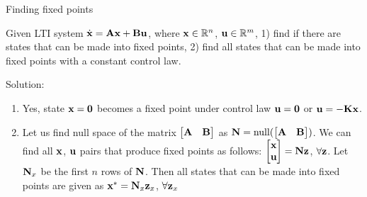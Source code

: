 \documentclass{beamer}
\begin{document}
\begin{frame}{Finding fixed points}
\begin{flushleft}

Given LTI system $\dot{\mathbf{x}} = \mathbf{A} \mathbf{x} + \mathbf{B} \mathbf{u}$, where $\mathbf{x} \in \mathbb{R}^n$, $\mathbf{u} \in \mathbb{R}^m$, 1) find if there are states that can be made into fixed points, 2) find all states that can be made into fixed points with a constant control law.

\bigskip

Solution: 

\begin{enumerate}
    \item Yes, state $\mathbf{x} = \mathbf{0}$ becomes a fixed point under control law $\mathbf{u} = \mathbf{0}$ or $\mathbf{u} = -\mathbf{K}\mathbf{x}$.
    \item Let us find null space of the matrix $\begin{bmatrix} \mathbf{A} & \mathbf{B} \end{bmatrix}$ as $\mathbf{N} = \text{null} (\begin{bmatrix} \mathbf{A} & \mathbf{B} \end{bmatrix})$. We can find all $\mathbf{x}$, $\mathbf{u}$ pairs that produce fixed points as follows: $\begin{bmatrix} \mathbf{x} \\ \mathbf{u} \end{bmatrix} = \mathbf{N} \mathbf{z}$, $\forall \mathbf{z}$. Let $\mathbf{N}_x$ be the first $n$ rows of $\mathbf{N}$. Then all states that can be made into fixed points are given as $\mathbf{x}^* = \mathbf{N}_x \mathbf{z}_x$, $\forall \mathbf{z}_x$
\end{enumerate}

\end{flushleft}
\end{frame}
\end{document}
